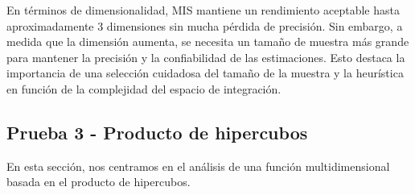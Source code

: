 \documentclass{article}
\begin{document}
En términos de dimensionalidad, MIS mantiene un rendimiento aceptable hasta aproximadamente 3 dimensiones sin mucha pérdida de precisión. Sin embargo, a medida que la dimensión aumenta, se necesita un tamaño de muestra más grande para mantener la precisión y la confiabilidad de las estimaciones. Esto destaca la importancia de una selección cuidadosa del tamaño de la muestra y la heurística en función de la complejidad del espacio de integración.

\subsection{Prueba 3 - Producto de hipercubos}

En esta sección, nos centramos en el análisis de una función multidimensional basada en el producto de hipercubos.
\end{document}
